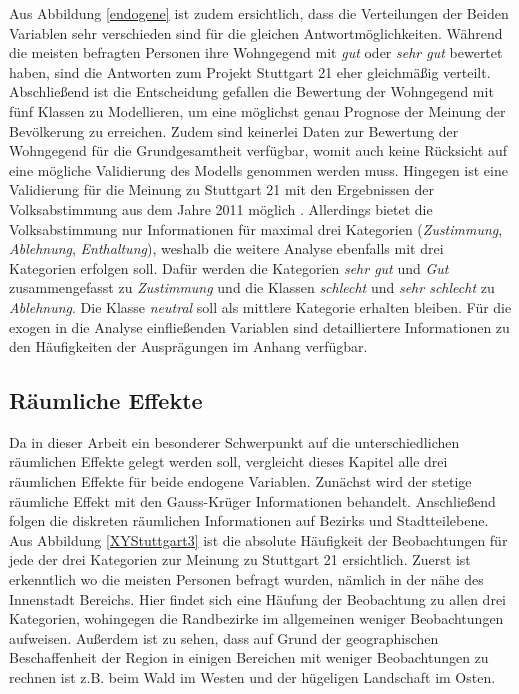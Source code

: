 \documentclass{Vorlage}
\begin{document}
Aus Abbildung \ref{endogene} ist zudem ersichtlich, dass die Verteilungen der Beiden Variablen sehr verschieden sind für die gleichen Antwortmöglichkeiten. Während die meisten befragten Personen ihre Wohngegend mit \textit{gut} oder \textit{sehr gut} bewertet haben, sind die Antworten zum Projekt Stuttgart 21 eher gleichmäßig verteilt.\\
Abschließend ist die Entscheidung gefallen die Bewertung der Wohngegend mit fünf Klassen zu Modellieren, um eine möglichst genau Prognose der Meinung der Bevölkerung zu erreichen. Zudem sind keinerlei Daten zur Bewertung der Wohngegend für die Grundgesamtheit verfügbar, womit auch keine Rücksicht auf eine mögliche Validierung des Modells genommen werden muss. Hingegen ist eine Validierung für die Meinung zu Stuttgart 21 mit den Ergebnissen der Volksabstimmung aus dem Jahre 2011 möglich \cite{Amt}. Allerdings bietet die Volksabstimmung nur Informationen für maximal drei Kategorien (\textit{Zustimmung}, \textit{Ablehnung}, \textit{Enthaltung}), weshalb die weitere Analyse ebenfalls mit drei Kategorien erfolgen soll. Dafür werden die Kategorien \textit{sehr gut} und \textit{Gut} zusammengefasst zu \textit{Zustimmung} und die Klassen \textit{schlecht} und \textit{sehr schlecht} zu \textit{Ablehnung}. Die Klasse \textit{neutral} soll als mittlere Kategorie erhalten bleiben. 
Für die exogen in die Analyse einfließenden Variablen sind detailliertere Informationen zu den Häufigkeiten der Ausprägungen im Anhang verfügbar. 

\newpage

\subsection{Räumliche Effekte}

Da in dieser Arbeit ein besonderer Schwerpunkt auf die unterschiedlichen räumlichen Effekte gelegt werden soll, vergleicht dieses Kapitel alle drei räumlichen Effekte für beide endogene Variablen. Zunächst wird der stetige räumliche Effekt mit den Gauss-Krüger Informationen behandelt. Anschließend folgen die diskreten räumlichen Informationen auf Bezirks und Stadtteilebene.\\
Aus Abbildung \ref{XYStuttgart3} ist die absolute Häufigkeit der Beobachtungen für jede der drei Kategorien zur Meinung zu Stuttgart 21 ersichtlich. Zuerst ist erkenntlich wo die meisten Personen befragt wurden, nämlich in der nähe des Innenstadt Bereichs. Hier findet sich eine Häufung der Beobachtung zu allen drei Kategorien, wohingegen die Randbezirke im allgemeinen weniger Beobachtungen aufweisen. Außerdem ist zu sehen, dass auf Grund der geographischen Beschaffenheit der Region in einigen Bereichen mit weniger Beobachtungen zu rechnen ist z.B. beim Wald im Westen und der hügeligen Landschaft im Osten.    
\end{document}
